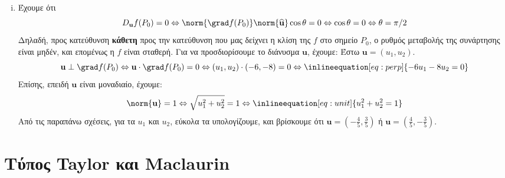 \begin{solution}
\begin{enumerate}[i)]
    \item Έχουμε ότι 
      \[ 
        D_{\mathbf{u}}f(P_{0}) = 0 \Leftrightarrow \norm{\grad f (P_{0})}
        \norm{\mathbf{\widehat{u}}} \cos{\theta} = 0 \Leftrightarrow 
        \cos{\theta} = 0 \Leftrightarrow \theta = \pi/2 
      \]
      Δηλαδή, προς κατεύθυνση \textbf{κάθετη} προς την κατεύθυνση που μας δείχνει η 
      κλίση της $ f $ στο σημείο $ P_{0} $, ο ρυθμός μεταβολής της συνάρτησης είναι 
      μηδέν, και επομένως η $f$ είναι σταθερή. Για να προσδιορίσουμε το διάνυσμα $
      \mathbf{u} $, έχουμε: Έστω $ \mathbf{u} = (u_{1}, u_{2}) $. 
      \[
        \mathbf{u} \perp \grad f(P_{0}) \Leftrightarrow \mathbf{u} \cdot 
        \grad f (P_{0}) = 0 \Leftrightarrow (u_1,u_{2}) \cdot (-6,-8) =
        0 \Leftrightarrow \inlineequation[eq:perp]{-6u_{1}-8u_{2}=0}
      \]
      Επίσης, επειδή $ \mathbf{u} $ είναι μοναδιαίο, έχουμε: 
      \[
        \norm{\mathbf{u}} =1 \Leftrightarrow \sqrt{u_{1}^{2}+u_{2}^{2}} = 1
        \Leftrightarrow \inlineequation[eq:unit]{u_{1}^{2}+u_{2}^{2}=1}
      \] 
      Από τις παραπάνω σχέσεις, για τα $ u_{1} $ και $ u_{2} $, εύκολα τα υπολογίζουμε,
      και βρίσκουμε ότι $ \mathbf{u} = \left(- \frac{4}{5}
      , \frac{3}{5}\right) $ ή $ \mathbf{u} = 
      \left( \frac{4}{5} , - \frac{3}{5}\right) $. 
  \end{enumerate}
\end{solution}


\section{Τύπος Taylor και Maclaurin}


